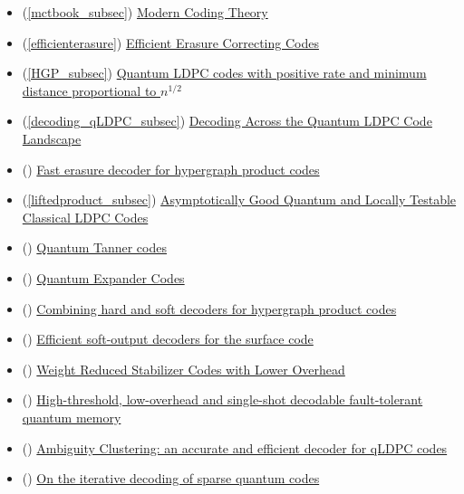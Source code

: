 \documentclass{article}
\begin{document}
\begin{itemize}
    \item (\ref{mctbook_subsec}) \cite{moderncodingtheory} \href{https://www.karlin.mff.cuni.cz/~holub/soubory/ModernCodingTheory.pdf}{Modern Coding Theory}
    \item (\ref{efficienterasure}) \cite{efficienterasure} \href{https://www.cs.yale.edu/homes/spielman/PAPERS/eraseIT.pdf}{Efficient Erasure Correcting Codes}
    \item (\ref{HGP_subsec}) \cite{Tillich_2014} \href{https://arxiv.org/pdf/0903.0566}{Quantum LDPC codes with positive rate and minimum distance proportional to $n^{1/2}$}
    \item (\ref{decoding_qLDPC_subsec}) \cite{Roffe_2020} \href{https://arxiv.org/pdf/2005.07016}{Decoding Across the Quantum LDPC Code Landscape} 
    \item () \cite{Connolly_2024} \href{https://arxiv.org/pdf/2208.01002}{Fast erasure decoder for hypergraph product codes}
    \item (\ref{liftedproduct_subsec}) \cite{panteleev2022asymptoticallygoodquantumlocally} \href{https://arxiv.org/pdf/2111.03654}{Asymptotically Good Quantum and Locally Testable Classical LDPC Codes} 
    \item () \cite{leverrier2022quantumtannercodes} \href{https://arxiv.org/pdf/2202.13641}{Quantum Tanner codes}
    \item () \cite{Leverrier_2015} \href{https://arxiv.org/pdf/1504.00822}{Quantum Expander Codes} 
    \item () \cite{Grospellier_2021} \href{https://arxiv.org/pdf/2004.11199}{Combining hard and soft decoders for hypergraph product codes}
    \item () \cite{meister2024efficientsoftoutputdecoderssurface} \href{https://arxiv.org/pdf/2405.07433}{Efficient soft-output decoders for the surface code}
    \item () \cite{sabo2024weightreducedstabilizercodes} \href{https://arxiv.org/pdf/2402.05228}{Weight Reduced Stabilizer Codes with Lower Overhead}
    \item () \cite{scruby2024highthresholdlowoverheadsingleshotdecodable} \href{https://arxiv.org/pdf/2406.14445}{High-threshold, low-overhead and single-shot decodable fault-tolerant quantum memory}
    \item () \cite{wolanski2024ambiguityclusteringaccurateefficient} \href{https://arxiv.org/pdf/2406.14527}{Ambiguity Clustering: an accurate and efficient decoder for qLDPC codes}
    \item () \cite{poulin2008iterativedecodingsparsequantum} \href{https://arxiv.org/pdf/0801.1241}{On the iterative decoding of sparse quantum codes}

\end{itemize}
\end{document}
